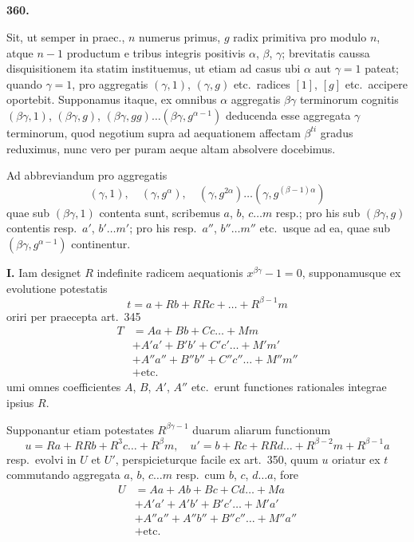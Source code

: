 \documentclass[12pt,a4paper]{article}
\theoremstyle{plain}
\theoremstyle{definition}
\theoremstyle{remark}
\begin{document}
\subsection*{}

\begin{center}
\textbf{360.}
\end{center}

Sit, ut semper in praec., $n$ numerus primus, $g$ radix primitiva pro modulo $n$, atque $n-1$ productum e tribus integris positivis $\alpha$, $\beta$, $\gamma$; brevitatis caussa disquisitionem ita statim instituemus, ut etiam ad casus ubi $\alpha$ aut $\gamma = 1$ pateat; quando $\gamma = 1$, pro aggregatis $(\gamma, 1)$, $(\gamma, g)$ etc.\ radices $[1]$, $[g]$ etc.\ accipere oportebit. Supponamus itaque, ex omnibus $\alpha$ aggregatis $\beta\gamma$ terminorum cognitis $(\beta\gamma, 1)$, $(\beta\gamma, g)$, $(\beta\gamma, gg) \ldots (\beta\gamma, g^{\alpha-1})$ deducenda esse aggregata $\gamma$ terminorum, quod negotium supra ad aequationem affectam $\beta^{ti}$ gradus reduximus, nunc vero per puram aeque altam absolvere docebimus.

Ad abbreviandum pro aggregatis
\[(\gamma, 1), \quad (\gamma, g^\alpha), \quad (\gamma, g^{2\alpha}) \ldots (\gamma, g^{(\beta-1)\alpha})\]
quae sub $(\beta\gamma, 1)$ contenta sunt, scribemus $a$, $b$, $c \ldots m$ resp.; pro his sub $(\beta\gamma, g)$ contentis resp.\ $a'$, $b' \ldots m'$; pro his resp.\ $a''$, $b'' \ldots m''$ etc.\ usque ad ea, quae sub $(\beta\gamma, g^{\alpha-1})$ continentur.

\textbf{I.} Iam designet $R$ indefinite radicem aequationis $x^{\beta\gamma} - 1 = 0$, supponamusque ex evolutione potestatis
\[t = a + Rb + RRc + \ldots + R^{\beta-1}m\]
oriri per praecepta art.\ 345
\begin{align*}
T &= Aa + Bb + Cc \ldots + Mm \\
&+ A'a' + B'b' + C'c' \ldots + M'm' \\
&+ A''a'' + B''b'' + C''c'' \ldots + M''m'' \\
&+ \text{etc.}
\end{align*}
umi omnes coefficientes $A$, $B$, $A'$, $A''$ etc.\ erunt functiones rationales integrae ipsius $R$.

Supponantur etiam potestates $R^{\beta\gamma - 1}$ duarum aliarum functionum
\[u = Ra + RRb + R^3c \ldots + R^\beta m, \quad u' = b + Rc + RRd \ldots + R^{\beta-2}m + R^{\beta-1}a\]
resp.\ evolvi in $U$ et $U'$, perspicieturque facile ex art.\ 350, quum $u$ oriatur ex $t$ commutando aggregata $a$, $b$, $c \ldots m$ resp.\ cum $b$, $c$, $d \ldots a$, fore
\begin{align*}
U &= Aa + Ab + Bc + Cd \ldots + Ma \\
&+ A'a' + A'b' + B'c' \ldots + M'a' \\
&+ A''a'' + A''b'' + B''c'' \ldots + M''a'' \\
&+ \text{etc.}
\end{align*}
\end{document}
